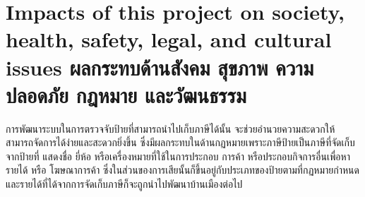 
\section{\ifenglish%
Impacts of this project on society, health, safety, legal, and cultural issues
\else%
ผลกระทบด้านสังคม สุขภาพ ความปลอดภัย กฎหมาย และวัฒนธรรม
\fi}

การพัฒนาระบบในการตรวจจับป้ายที่สามารถนำไปเก็บภาษีได้นั้น จะช่วยอำนวยความสะดวกให้สามารถจัดการได้ง่ายและสะดวกยิ่งขึ้น 
ซึ่งมีผลกระทบในด้านกฏหมายเพราะภาษีป้ายเป็นภาษีที่จัดเก็บจากป้ายที่ แสดงชื่อ ยี่ห้อ หรือเครื่องหมายที่ใช้ในการประกอบ การค้า หรือประกอบกิจการอื่นเพื่อหารายได้ หรือ 
โฆษณาการค้า ซึ่งในส่วนของการเสียนั้นก็ขึ้นอยู่กับประเภทของป้ายตามที่กฏหมายกำหนด และรายได้ที่ได้จากการจัดเก็บภาษีก็จะถูกนำไปพัฒนาบ้านเมืองต่อไป

